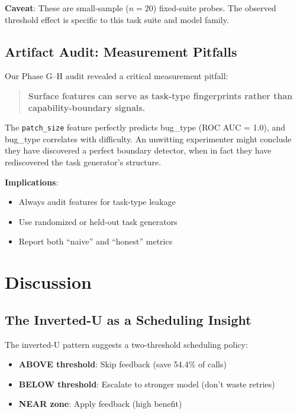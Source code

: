 \documentclass[11pt,a4paper]{article}
\begin{document}
\textbf{Caveat}: These are small-sample ($n=20$) fixed-suite probes. The observed threshold effect is specific to this task suite and model family.

\subsection{Artifact Audit: Measurement Pitfalls}

Our Phase G--H audit revealed a critical measurement pitfall:

\begin{quote}
\textbf{Surface features can serve as task-type fingerprints rather than capability-boundary signals.}
\end{quote}

The \texttt{patch\_size} feature perfectly predicts bug\_type (ROC AUC = 1.0), and bug\_type correlates with difficulty. An unwitting experimenter might conclude they have discovered a perfect boundary detector, when in fact they have rediscovered the task generator's structure.

\textbf{Implications}:
\begin{itemize}
    \item Always audit features for task-type leakage
    \item Use randomized or held-out task generators
    \item Report both ``naive'' and ``honest'' metrics
\end{itemize}

\section{Discussion}

\subsection{The Inverted-U as a Scheduling Insight}

The inverted-U pattern suggests a two-threshold scheduling policy:
\begin{itemize}
    \item \textbf{ABOVE threshold}: Skip feedback (save 54.4\% of calls)
    \item \textbf{BELOW threshold}: Escalate to stronger model (don't waste retries)
    \item \textbf{NEAR zone}: Apply feedback (high benefit)
\end{itemize}
\end{document}
